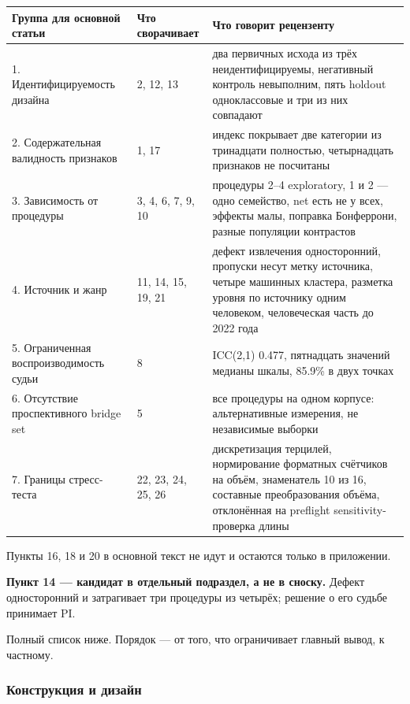 \documentclass[11pt,a4paper]{article}
\renewcommand{\_}{\textunderscore\allowbreak}
\begin{document}
\begin{center}
\small
\begin{tabularx}{\textwidth}{llX}
\toprule
Группа для основной статьи & Что сворачивает & Что говорит рецензенту \\
\midrule
1. Идентифицируемость дизайна & 2, 12, 13 & два первичных исхода из трёх неидентифицируемы, негативный контроль невыполним, пять holdout одноклассовые и три из них совпадают \\
2. Содержательная валидность признаков & 1, 17 & индекс покрывает две категории из тринадцати полностью, четырнадцать признаков не посчитаны \\
3. Зависимость от процедуры & 3, 4, 6, 7, 9, 10 & процедуры 2–4 exploratory, 1 и 2 — одно семейство, net есть не у всех, эффекты малы, поправка Бонферрони, разные популяции контрастов \\
4. Источник и жанр & 11, 14, 15, 19, 21 & дефект извлечения односторонний, пропуски несут метку источника, четыре машинных кластера, разметка уровня по источнику одним человеком, человеческая часть до 2022 года \\
5. Ограниченная воспроизводимость судьи & 8 & ICC(2,1) 0.477, пятнадцать значений медианы шкалы, 85.9\% в двух точках \\
6. Отсутствие проспективного bridge set & 5 & все процедуры на одном корпусе: альтернативные измерения, не независимые выборки \\
7. Границы стресс-теста & 22, 23, 24, 25, 26 & дискретизация терцилей, нормирование форматных счётчиков на объём, знаменатель 10 из 16, составные преобразования объёма, отклонённая на preflight sensitivity-проверка длины \\
\bottomrule
\end{tabularx}
\end{center}

Пункты 16, 18 и 20 в основной текст не идут и остаются только в приложении.

\textbf{Пункт 14 — кандидат в отдельный подраздел, а не в сноску.} Дефект односторонний и затрагивает три процедуры из четырёх; решение о его судьбе принимает PI.

Полный список ниже. Порядок — от того, что ограничивает главный вывод, к частному.

\subsubsection{Конструкция и дизайн}
\end{document}

